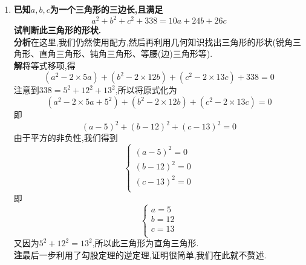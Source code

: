 \documentclass[UTF8]{ctexart}
\begin{document}
\begin{enumerate}
\item \textbf{已知$a,b,c$为一个三角形的三边长,且满足
\[a^2+b^2+c^2+338=10a+24b+26c\]
试判断此三角形的形状.}\\
\hspace*{2em}\textbf{分析}\quad 在这里,我们仍然使用配方,然后再利用几何知识找出三角形的形状(锐角三角形、直角三角形、钝角三角形、等腰(边)三角形等).\\
\hspace*{2em}\textbf{解}\quad 将等式移项,得
\[(a^2-2\times 5a)+(b^2-2\times 12b)+(c^2-2\times 13c)+338=0\]
注意到$338=5^2+12^2+13^2$,所以将原式化为
\[(a^2-2\times 5a+5^2)+(b^2-2\times 12b)+(c^2-2\times 13c)=0\]
即
\[(a-5)^2+(b-12)^2+(c-13)^2=0\]
\hspace*{2em}由于平方的非负性,我们得到
\[\begin{cases}
(a-5)^2=0\\(b-12)^2=0\\(c-13)^2=0\\
\end{cases}\]
即
\[\begin{cases}
a=5\\b=12\\c=13\\
\end{cases}\]
\hspace*{2em}又因为$5^2+12^2=13^2$,所以此三角形为直角三角形.\\
\hspace*{2em}\textbf{注}\quad 最后一步利用了勾股定理的逆定理,证明很简单,我们在此就不赘述.
\end{enumerate}
\end{document}
